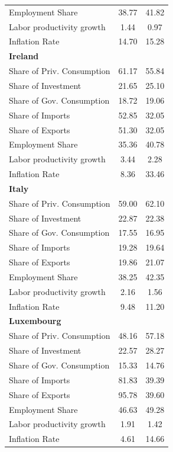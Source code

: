 \documentclass[12pt]{article}
\begin{document}
\begin{appendices}
\begin{center}
\begin{longtable}{lcc}
Employment Share &     38.77 &     41.82 \\  
Labor productivity growth &      1.44 &      0.97 \\  
Inflation Rate &     14.70 &     15.28 \\    \hline
\textbf{Ireland} &  &  \\  
Share of Priv. Consumption &     61.17 &     55.84 \\  
Share of Investment &     21.65 &     25.10 \\  
Share of Gov. Consumption &     18.72 &     19.06 \\  
Share of Imports &     52.85 &     32.05 \\  
Share of Exports &     51.30 &     32.05 \\  
Employment Share &     35.36 &     40.78 \\  
Labor productivity growth &      3.44 &      2.28 \\  
Inflation Rate &      8.36 &     33.46 \\   \hline
\textbf{Italy} &  &  \\  
Share of Priv. Consumption &     59.00 &     62.10 \\  
Share of Investment &     22.87 &     22.38 \\  
Share of Gov. Consumption &     17.55 &     16.95 \\  
Share of Imports &     19.28 &     19.64 \\  
Share of Exports &     19.86 &     21.07 \\  
Employment Share &     38.25 &     42.35 \\  
Labor productivity growth &      2.16 &      1.56 \\  
Inflation Rate &      9.48 &     11.20 \\  \hline
\textbf{Luxembourg} &  &  \\  
Share of Priv. Consumption &     48.16 &     57.18 \\  
Share of Investment &     22.57 &     28.27 \\  
Share of Gov. Consumption &     15.33 &     14.76 \\  
Share of Imports &     81.83 &     39.39 \\  
Share of Exports &     95.78 &     39.60 \\  
Employment Share &     46.63 &     49.28 \\  
Labor productivity growth &      1.91 &      1.42 \\  
Inflation Rate &      4.61 &     14.66 \\   \hline

\end{longtable}
\end{center}
\end{appendices}
\end{document}
